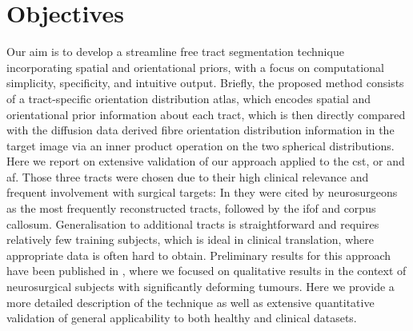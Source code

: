 \section{Objectives}
\label{sec:problem}



Our aim is to develop a streamline free tract segmentation technique incorporating spatial and orientational priors, with a focus on computational simplicity, specificity, and intuitive output.
Briefly, the proposed method consists of a tract-specific orientation distribution atlas, which encodes spatial and orientational prior information about each tract, which is then directly compared with the diffusion data derived fibre orientation distribution information in the target image via an inner product operation on the two spherical distributions.
Here we report on extensive validation of our approach applied to the \gls{cst}, \gls{or} and \gls{af}.
Those three tracts were chosen due to their high clinical relevance and frequent involvement with surgical targets: In \textcite{Toescu2020} they were cited by neurosurgeons as the most frequently reconstructed tracts, followed by the \gls{ifof} and corpus callosum.
Generalisation to additional tracts is straightforward and requires relatively few training subjects, which is ideal in clinical translation, where appropriate data is often hard to obtain.
Preliminary results for this approach have been published in \textcite{Young2022}, where we focused on qualitative results in the context of neurosurgical subjects with significantly deforming tumours.
Here we provide a more detailed description of the technique as well as extensive quantitative validation of general applicability to both healthy and clinical datasets.
